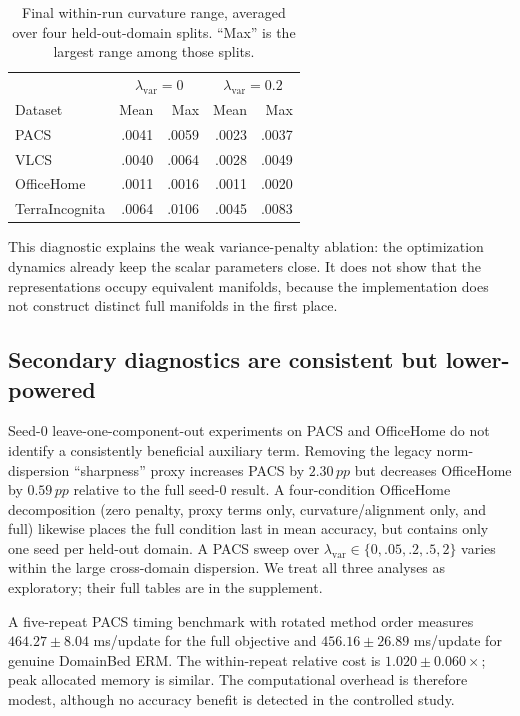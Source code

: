 \documentclass[10pt]{article}
\newcommand{\pp}{\,pp}
\begin{document}
\begin{table}[t]
\centering
\caption{Final within-run curvature range, averaged over four held-out-domain
splits. ``Max'' is the largest range among those splits.}
\label{tab:spread}
\begin{tabular}{lrrrr}
\toprule
& \multicolumn{2}{c}{$\lambda_{\mathrm{var}}=0$}
& \multicolumn{2}{c}{$\lambda_{\mathrm{var}}=0.2$} \\
Dataset & Mean & Max & Mean & Max \\
\midrule
PACS           & .0041 & .0059 & .0023 & .0037 \\
VLCS           & .0040 & .0064 & .0028 & .0049 \\
OfficeHome     & .0011 & .0016 & .0011 & .0020 \\
TerraIncognita & .0064 & .0106 & .0045 & .0083 \\
\bottomrule
\end{tabular}
\end{table}

This diagnostic explains the weak variance-penalty ablation: the optimization
dynamics already keep the scalar parameters close. It does not show that the
representations occupy equivalent manifolds, because the implementation does
not construct distinct full manifolds in the first place.

\FloatBarrier

\subsection{Secondary diagnostics are consistent but lower-powered}

Seed-0 leave-one-component-out experiments on PACS and OfficeHome do not
identify a consistently beneficial auxiliary term. Removing the legacy
norm-dispersion ``sharpness'' proxy increases PACS by $2.30\pp$ but decreases
OfficeHome by $0.59\pp$ relative to the full seed-0 result. A four-condition
OfficeHome decomposition (zero penalty, proxy terms only, curvature/alignment
only, and full) likewise places the full condition last in mean accuracy, but
contains only one seed per held-out domain. A PACS sweep over
$\lambda_{\mathrm{var}}\in\{0,.05,.2,.5,2\}$ varies within the large
cross-domain dispersion. We treat all three analyses as exploratory; their
full tables are in the supplement.

A five-repeat PACS timing benchmark with rotated method order measures
$464.27\pm8.04$ ms/update for the full objective and
$456.16\pm26.89$ ms/update for genuine DomainBed ERM. The within-repeat
relative cost is $1.020\pm0.060\times$; peak allocated memory is similar. The
computational overhead is therefore modest, although no accuracy benefit is
detected in the controlled study.
\end{document}
